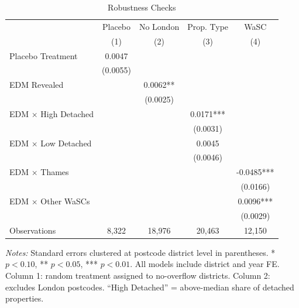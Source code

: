 \begin{table}[htbp]
\centering
\caption{Robustness Checks}
\label{tab:robustness}
\begin{tabular}{lcccc}
\toprule
 & Placebo & No London & Prop. Type & WaSC \\
 & (1) & (2) & (3) & (4) \\
\midrule
Placebo Treatment & 0.0047 & & & \\
 & (0.0055) & & & \\
EDM Revealed & & 0.0062** & & \\
 & & (0.0025) & & \\
EDM $\times$ High Detached & & & 0.0171*** & \\
 & & & (0.0031) & \\
EDM $\times$ Low Detached & & & 0.0045 & \\
 & & & (0.0046) & \\
EDM $\times$ Thames & & & & -0.0485*** \\
 & & & & (0.0166) \\
EDM $\times$ Other WaSCs & & & & 0.0096*** \\
 & & & & (0.0029) \\
\midrule
Observations & 8,322 & 18,976 & 20,463 & 12,150 \\
\bottomrule
\end{tabular}
\begin{tablenotes}[flushleft]\small
\item \textit{Notes:} Standard errors clustered at postcode district level in parentheses. * $p<0.10$, ** $p<0.05$, *** $p<0.01$. All models include district and year FE. Column 1: random treatment assigned to no-overflow districts. Column 2: excludes London postcodes. ``High Detached'' = above-median share of detached properties.
\end{tablenotes}
\end{table}

